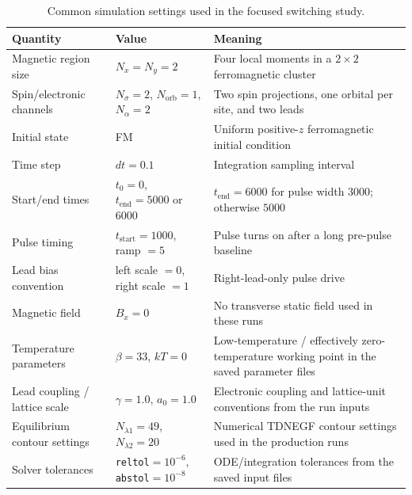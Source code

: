 \documentclass[11pt]{article}
\begin{document}
\begin{table}[H]
\centering
\caption{Common simulation settings used in the focused switching study.}
\label{tab:common-params}
\small
\begin{tabularx}{\textwidth}{>{\raggedright\arraybackslash}p{} >{\raggedright\arraybackslash}p{} Y}
\toprule
Quantity & Value & Meaning \\
\midrule
Magnetic region size & \(N_x=N_y=2\) & Four local moments in a \(2\times 2\) ferromagnetic cluster \\
Spin/electronic channels & \(N_\sigma=2\), \(N_{\mathrm{orb}}=1\), \(N_\alpha=2\) & Two spin projections, one orbital per site, and two leads \\
Initial state & FM & Uniform positive-\(z\) ferromagnetic initial condition \\
Time step & \(dt=0.1\) & Integration sampling interval \\
Start/end times & \(t_0=0\), \(t_{\mathrm{end}}=5000\) or \(6000\) & \(t_{\mathrm{end}}=6000\) for pulse width \(3000\); otherwise \(5000\) \\
Pulse timing & \(t_{\mathrm{start}}=1000\), ramp \(=5\) & Pulse turns on after a long pre-pulse baseline \\
Lead bias convention & left scale \(=0\), right scale \(=1\) & Right-lead-only pulse drive \\
Magnetic field & \(B_x=0\) & No transverse static field used in these runs \\
Temperature parameters & \(\beta=33\), \(kT=0\) & Low-temperature / effectively zero-temperature working point in the saved parameter files \\
Lead coupling / lattice scale & \(\gamma=1.0\), \(a_0=1.0\) & Electronic coupling and lattice-unit conventions from the run inputs \\
Equilibrium contour settings & \(N_{\lambda 1}=49\), \(N_{\lambda 2}=20\) & Numerical TDNEGF contour settings used in the production runs \\
Solver tolerances & \texttt{reltol}\(=10^{-6}\), \texttt{abstol}\(=10^{-8}\) & ODE/integration tolerances from the saved input files \\
\bottomrule
\end{tabularx}
\normalsize
\end{table}
\end{document}
